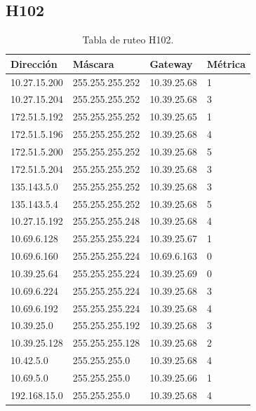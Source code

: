 \documentclass[12pt,titlepage]{article}
\begin{document}
\subsection{H102}
\begin{table}
  \begin{center}
    \begin{tabular}{|l|l|l|l|}
      \hline
        \bf{Direcci\'on} & \bf{M\'ascara} & \bf{Gateway} & \bf{M\'etrica} \\
      \hline 
	10.27.15.200  & 255.255.255.252 & 10.39.25.68 & 1 \\
        10.27.15.204  & 255.255.255.252 & 10.39.25.68 & 3 \\
        172.51.5.192  & 255.255.255.252 & 10.39.25.65 & 1 \\
        172.51.5.196  & 255.255.255.252 & 10.39.25.68 & 4 \\
        172.51.5.200  & 255.255.255.252 & 10.39.25.68 & 5 \\
        172.51.5.204  & 255.255.255.252 & 10.39.25.68 & 3 \\
        135.143.5.0   & 255.255.255.252 & 10.39.25.68 & 3 \\
        135.143.5.4   & 255.255.255.252 & 10.39.25.68 & 5 \\ 	
	10.27.15.192  & 255.255.255.248 & 10.39.25.68 & 4 \\
	10.69.6.128   & 255.255.255.224 & 10.39.25.67 & 1 \\
        10.69.6.160   & 255.255.255.224 & 10.69.6.163 & 0 \\
	10.39.25.64   & 255.255.255.224 & 10.39.25.69 & 0 \\       
	10.69.6.224   & 255.255.255.224 & 10.39.25.68 & 3 \\
	10.69.6.192   & 255.255.255.224 & 10.39.25.68 & 4 \\	
	10.39.25.0    & 255.255.255.192 & 10.39.25.68 & 3 \\
	10.39.25.128  & 255.255.255.128 & 10.39.25.68 & 2 \\
	10.42.5.0     & 255.255.255.0 & 10.39.25.68 & 4 \\
        10.69.5.0     & 255.255.255.0 & 10.39.25.66 & 1 \\
        192.168.15.0  & 255.255.255.0 & 10.39.25.68 & 4 \\  
    \hline
    \end{tabular} \\
  \end{center}
  \caption{Tabla de ruteo H102.}
\end{table}
\newpage
\end{document}
